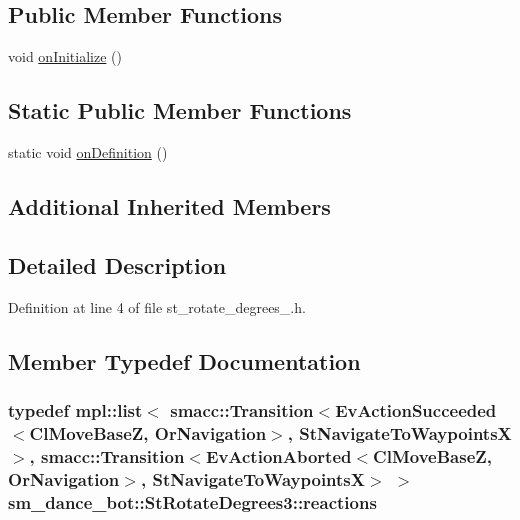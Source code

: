 \subsection*{Public Member Functions}
\begin{DoxyCompactItemize}
\item 
void \hyperlink{structsm__dance__bot_1_1StRotateDegrees3_aa0c183896017fc1f42454fc1d9831d4a}{on\+Initialize} ()
\end{DoxyCompactItemize}
\subsection*{Static Public Member Functions}
\begin{DoxyCompactItemize}
\item 
static void \hyperlink{structsm__dance__bot_1_1StRotateDegrees3_aae35bb91e449f5266b40a42ba757d1cd}{on\+Definition} ()
\end{DoxyCompactItemize}
\subsection*{Additional Inherited Members}


\subsection{Detailed Description}


Definition at line 4 of file st\+\_\+rotate\+\_\+degrees\+\_.\+h.



\subsection{Member Typedef Documentation}
\subsubsection[{\texorpdfstring{reactions}{reactions}}]{\setlength{\rightskip}{0pt plus 5cm}typedef mpl\+::list$<$ {\bf smacc\+::\+Transition}$<$Ev\+Action\+Succeeded$<${\bf Cl\+Move\+BaseZ}, {\bf Or\+Navigation}$>$, {\bf St\+Navigate\+To\+WaypointsX}$>$, {\bf smacc\+::\+Transition}$<$Ev\+Action\+Aborted$<${\bf Cl\+Move\+BaseZ}, {\bf Or\+Navigation}$>$, {\bf St\+Navigate\+To\+WaypointsX}$>$ $>$ {\bf sm\+\_\+dance\+\_\+bot\+::\+St\+Rotate\+Degrees3\+::reactions}}\hypertarget{structsm__dance__bot_1_1StRotateDegrees3_a56ce552cd6cff4127d52d0972902c590}{}\label{structsm__dance__bot_1_1StRotateDegrees3_a56ce552cd6cff4127d52d0972902c590}


